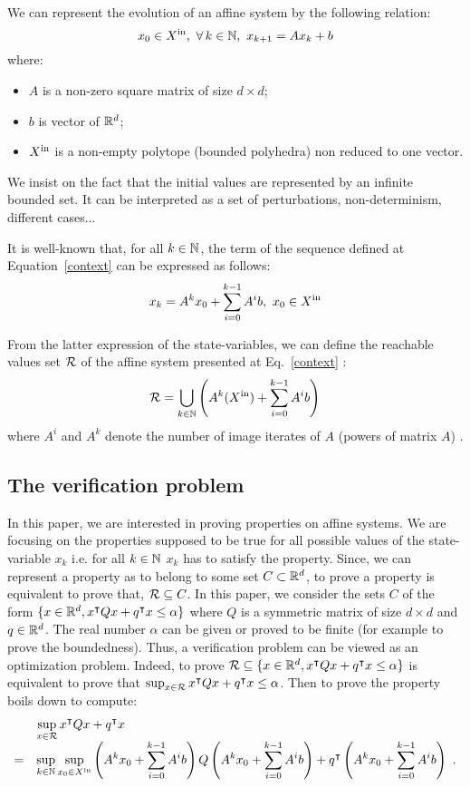 \documentclass[10pt]{article}
\begin{document}
We can represent the evolution of an affine system by the following relation:
\begin{equation}
\label{context}
x_0\in X^\mathrm{in},\ \forall\, k\in\mathbb{N},\ x_{k+1}=A x_k + b  
\end{equation}
where:
\begin{itemize}
\item $A$ is a non-zero square matrix of size $d\times d$;
\item $b$ is vector of $\mathbb R^d$;
\item  $X^\mathrm{in}$ is a non-empty polytope (bounded polyhedra) non reduced to one vector. 
\end{itemize}
We insist on the fact that the initial values are represented by an infinite bounded set. It can be interpreted as a set of perturbations, non-determinism, different cases...

It is well-known that, for all $k\in\mathbb{N}$, the term of the sequence defined at Equation~\eqref{context} can be expressed as follows:
\[
x_k=A^k x_0+ \sum_{i=0}^{k-1} A^i b,\ x_0\in\xin
\]

From the latter expression of the state-variables, we can define the reachable values set $\mathcal{R}$ of the affine system presented at Eq.~\eqref{context} :
\begin{equation}
\label{reach}
\mathcal{R}=\bigcup_{k\in \mathbb{N}} \left(A^{k}(X^\mathrm{in})+\sum_{i=0}^{k-1} A^i b\right)
\end{equation}
where $A^i$ and $A^k$ denote the number of image iterates of $A$ (powers of matrix $A$) . 

\subsection{The verification problem}
In this paper, we are interested in proving properties on affine systems. We are focusing on the properties supposed to be true for all possible values of the state-variable $x_k$ i.e. for all $k\in\mathbb{N}$ $x_k$ has to satisfy the property. Since, we can represent a property as to belong to some set $C\subset \mathbb R^d$, to prove a property is equivalent to prove that, $\mathcal{R}\subseteq C$. In this paper, we consider the sets $C$  of the form $\{x\in\mathbb R^d, x^\intercal Q x+q^\intercal x\leq \alpha\}$ where $Q$ is a symmetric matrix of size $d\times d$ and $q\in\mathbb R^d$. The real number $\alpha$ can be given or proved to be finite (for example to prove the boundedness).  Thus, a verification problem can be viewed as an optimization problem. Indeed, to prove $\mathcal{R}\subseteq \{x\in\mathbb R^d, x^\intercal Q x+q^\intercal x\leq \alpha\}$ is equivalent to prove that
$\sup_{x\in\mathcal{R}} x^\intercal Q x+q^\intercal x\leq \alpha$.
Then to prove the property boils down to compute: 
\begin{equation}
\label{pbopt}
\begin{array}{ll}
&\displaystyle{\sup_{x\in\mathcal{R}} x^\intercal Q x+q^\intercal x}\\
=&\displaystyle{\sup_{k\in\mathbb{N}}\sup_{x_0\in X^\mathrm{in}}  \left(A^k x_0+ \sum_{i=0}^{k-1} A^i b \right) Q \left( A^k x_0+ \sum_{i=0}^{k-1} A^i b\right) +q^\intercal \left(A^k x_0+ \sum_{i=0}^{k-1} A^i b\right)}\enspace .
\end{array}
\end{equation} 
\end{document}
